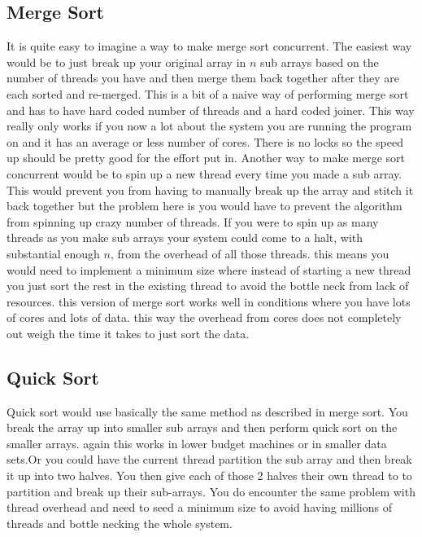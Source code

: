 \documentclass{article}
\begin{document}
\subsection{Merge Sort}
It is quite easy to imagine a way to make merge sort concurrent. The easiest way would be to just break up your original array in $n$ sub arrays based on the number of threads you have and then merge them back together after they are each sorted and re-merged. This is a bit of a naive way of performing merge sort and has to have hard coded number of threads and a hard coded joiner. This way really only works if you now a lot about the system you are running the program on and it has an average or less number of cores. There is no locks so the speed up should be pretty good for the effort put in.\newline
Another way to make merge sort concurrent would be to spin up a new thread every time you made a sub array. This would prevent you from having to manually break up the array and stitch it back together but the problem here is you would have to prevent the algorithm from spinning up crazy number of threads. If you were to spin up as many threads as you make sub arrays your system could come to a halt, with substantial enough $n$, from the overhead of all those threads. this means you would need to implement a minimum size where instead of starting a new thread you just sort the rest in the existing thread to avoid the bottle neck from lack of resources. this version of merge sort works well in conditions where you have lots of cores and lots of data. this way the overhead from cores does not completely out weigh the time it takes to just sort the data.
\subsection{Quick Sort}
Quick sort would use basically the same method as described in merge sort. You break the array up into smaller sub arrays and then perform quick sort on the smaller arrays. again this works in lower budget machines or in smaller data sets.\newline Or you could have the current thread partition the sub array and then break it up into two halves. You then give each of those 2 halves their own thread to to partition and break up their sub-arrays. You do encounter the same problem with thread overhead and need to seed a minimum size to avoid having millions of threads and bottle necking the whole system.
\end{document}
